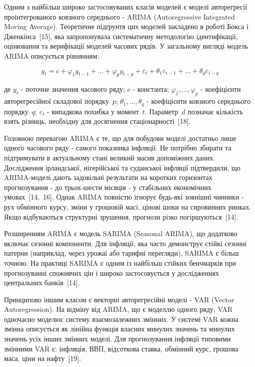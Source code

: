 \documentclass[a4paper,ukrainian,oneside]{extreport}
\begin{document}
Одним з найбільш широко застосовуваних класів моделей є моделі авторегресії проінтегрованого ковзного середнього - ARIMA (Autoregressive Integrated Moving Average). Теоретичне підґрунтя цих моделей закладено в роботі Бокса і Дженкінса~[15], яка запропонувала систематичну методологію ідентифікації, оцінювання та верифікації моделей часових рядів. У загальному вигляді модель ARIMA описується рівнянням:

\begin{equation}
y_t = c + \varphi_1 y_{t-1} + \ldots + \varphi_p y_{t-p}
      + \varepsilon_t + \theta_1\varepsilon_{t-1} + \ldots + \theta_q\varepsilon_{t-q}
\end{equation}

де $y_t$ - поточне значення часового ряду; $c$ - константа; $\varphi_1,\ldots,\varphi_p$ - коефіцієнти авторегресійної складової порядку~$p$; $\theta_1,\ldots,\theta_q$ - коефіцієнти ковзного середнього порядку~$q$; $\varepsilon_t$ - випадкова похибка у момент~$t$. Параметр~$d$ позначає кількість взять різниць, необхідну для досягнення стаціонарності~[18].

Головною перевагою ARIMA є те, що для побудови моделі достатньо лише одного часового ряду - самого показника інфляції. Не потрібно збирати та підтримувати в актуальному стані великий масив допоміжних даних. Дослідження ірландської, нігерійської та суданської інфляції підтвердили, що ARIMA-моделі дають задовільні результати на коротких горизонтах прогнозування - до трьох-шести місяців - у стабільних економічних умовах~[14,~16]. Однак ARIMA повністю ігнорує будь-які зовнішні чинники - рух обмінного курсу, зміни у грошовій масі, цінові шоки на сировинних ринках. Якщо відбуваються структурні зрушення, прогнози різко погіршуються~[14].

Розширенням ARIMA є модель SARIMA (Seasonal ARIMA), що додатково включає сезонні компоненти. Для інфляції, яка часто демонструє стійкі сезонні патерни (наприклад, через урожаї або тарифні перегляди), SARIMA є більш точною. На практиці SARIMA є одним із найбільш стійких бенчмарків при прогнозуванні споживчих цін і широко застосовується у дослідженнях центральних банків~[14].

Принципово іншим класом є векторні авторегресійні моделі - VAR (Vector Autoregression). На відміну від ARIMA, що є моделлю одного ряду, VAR одночасно моделює систему взаємозалежних змінних. У системі VAR кожна змінна описується як лінійна функція власних минулих значень та минулих значень усіх інших змінних моделі. Для прогнозування інфляції типовими змінними VAR є: інфляція, ВВП, відсоткова ставка, обмінний курс, грошова маса, ціни на нафту~[19].
\end{document}
